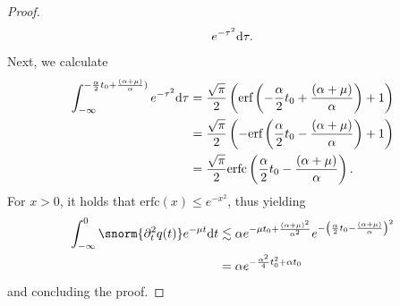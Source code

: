 \begin{proof}
\begin{equation}
\begin{aligned}
	e^{- \tau^2}
	\normalfont\text{d} \tau.
\end{aligned}
\end{equation}
Next, we calculate 
\begin{equation}
\begin{aligned}
	\int_{-\infty}^{-\frac{\alpha}{2} t_0+\frac{(\alpha+\mu)}{\alpha})}
	e^{- \tau^2}
	\normalfont\text{d} \tau
	&
	=
	\frac{\sqrt{\pi}}{2}
	\left(
		\text{erf}
		\left(
            -\frac{\alpha}{2} t_0+\frac{(\alpha+\mu)}{\alpha}
		\right)
		+ 
		1
	\right)
	\\
	&
	=
	\frac{\sqrt{\pi}}{2}
	\left(
		-
		\text{erf}
		\left(
            \frac{\alpha}{2} t_0
            -
            \frac{(\alpha+\mu)}{\alpha}
		\right)
		+ 
		1
	\right)
	\\
	&
	=
	\frac{\sqrt{\pi}}{2}
		\text{erfc}
		\left(
            \frac{\alpha}{2} t_0
            -
            \frac{(\alpha+\mu)}{\alpha}
		\right).
\end{aligned}
\end{equation}
For $x>0$, it holds that $\text{erfc}(x) \leq e^{-x^2}$,
thus yielding
\begin{equation}
\begin{aligned}
	\int_{-\infty}^{0}
	\snorm{\partial^2_t  q (t)}
	e^{-\mu t}
	\normalfont\text{d} t
	&
	\lesssim
	\alpha
	e^{
		-\mu t_0 
		+
		\frac{(\alpha+\mu)^2}{\alpha^2}
	}
	e^{
        -
        \left(
            \frac{\alpha}{2} t_0
            -
            \frac{(\alpha+\mu)}{\alpha}
        \right)^2
	}
	\\
	&
	=
	\alpha
	e^{
		-
        \frac{\alpha^2}{4} t^2_0
        +
        \alpha
        t_0
	}
\end{aligned}
\end{equation}
and concluding the proof.
\end{proof}

